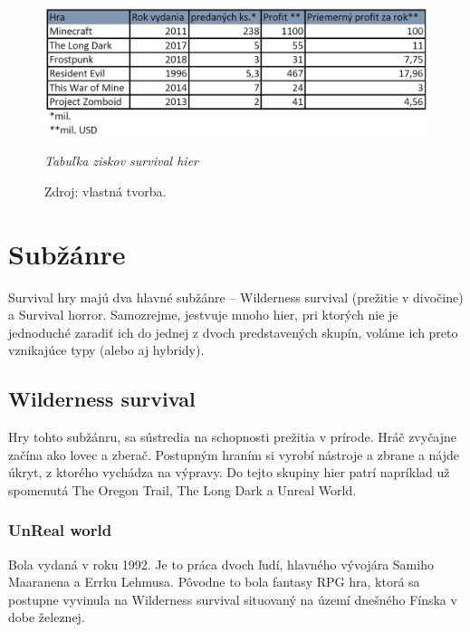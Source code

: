 \documentclass[10pt,oneoside,slovak,a4paper]{article}
\begin{document}
\begin{figure}[h]
	\begin{flushleft}
		
		\hspace*{-0.15cm}\includegraphics[width=12.5cm,keepaspectratio]{tabulka.png}
		\caption{\textit{Tabuľka ziskov survival hier}}
		\label{ fig:Tabuľka ziskov survival hier}
  		\caption*{Zdroj: vlastná tvorba.}
		
	\end{flushleft}
\end{figure}







\section{Subžánre} 
Survival hry majú dva hlavné subžánre – Wilderness survival (prežitie v divočine) a Survival  horror.  Samozrejme, jestvuje mnoho hier, pri ktorých nie je jednoduché zaradiť ich do jednej z dvoch predstavených skupín, voláme ich preto vznikajúce typy (alebo aj hybridy).\cite{Reid}

\subsection{Wilderness survival}

Hry tohto subžánru, sa sústredia na schopnosti prežitia v prírode. Hráč zvyčajne začína ako lovec a zberač. Postupným hraním si vyrobí nástroje a zbrane a nájde úkryt, z ktorého vychádza na výpravy. Do tejto skupiny hier patrí napríklad už spomenutá The Oregon Trail, The Long Dark a Unreal World.\cite{Wilds}

\subsubsection{UnReal world}
Bola vydaná v roku 1992. Je to práca dvoch ľudí, hlavného vývojára Samiho Maaranena a Errku Lehmusa. Pôvodne to bola fantasy RPG hra, ktorá sa postupne vyvinula na Wilderness survival situovaný na území dnešného Fínska v dobe železnej. \cite{Reid}
\end{document}
